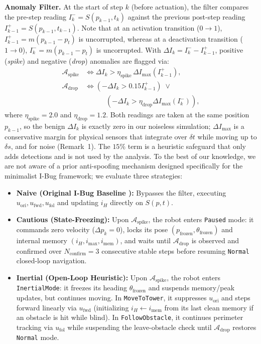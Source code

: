 \documentclass[10pt, a4paper, twocolumn]{article}
\begin{document}
\noindent\textbf{Anomaly Filter.}
At the start of step $k$ (before actuation), the filter compares the pre-step reading $I_k^- = S(p_{k-1}, t_k)$ against the previous post-step reading $I_{k-1}^+ = S(p_{k-1}, t_{k-1})$. Note that at an activation transition ($0 \to 1$), $I_{k-1}^+ = m(p_{k-1}-p_t)$ is uncorrupted, whereas at a deactivation transition ($1 \to 0$), $I_k^- = m(p_{k-1}-p_t)$ is uncorrupted. With $\Delta I_k = I_k^- - I_{k-1}^+$, positive (\textit{spike}) and negative (\textit{drop}) anomalies are flagged via:
\begin{align}
    \mathcal{A}_{\text{spike}} &\iff \Delta I_k > \eta_{\text{spike}}\,\Delta I_{\max}(I_{k-1}^+), \label{eq:spike} \\
    \mathcal{A}_{\text{drop}} &\iff (-\Delta I_k > 0.15 I_{k-1}^+) \;\lor \nonumber\\
    &\qquad\quad (-\Delta I_k > \eta_{\text{drop}}\Delta I_{\max}(I_k^-)), \label{eq:drop}
\end{align}
where $\eta_{\text{spike}} = 2.0$ and $\eta_{\text{drop}} = 1.2$. Both readings are taken at the same position $p_{k-1}$, so the benign $\Delta I_k$ is exactly zero in our noiseless simulation; $\Delta I_{\max}$ is a conservative margin for physical sensors that integrate over $\delta t$ while moving up to $\delta s$, and for noise (Remark~1). The $15\%$ term is a heuristic safeguard that only adds detections and is not used by the analysis. To the best of our knowledge, we are not aware of a prior anti-spoofing mechanism designed specifically for the minimalist I-Bug framework; we evaluate three strategies:
\begin{itemize}
    \item \textbf{Naive (Original I-Bug Baseline \cite{taylor2014intensity}):} Bypasses the filter, executing $u_{\text{ori}}, u_{\text{fwd}}, u_{\text{fol}}$ and updating $i_H$ directly on $S(p, t)$.
    \item \textbf{Cautious (State-Freezing):} Upon $\mathcal{A}_{\text{spike}}$, the robot enters \texttt{Paused} mode: it commands zero velocity ($\Delta p_k = 0$), locks its pose $(p_{\text{frozen}}, \theta_{\text{frozen}})$ and internal memory $(i_H, i_{\text{max}}, i_{\text{mem}})$, and waits until $\mathcal{A}_{\text{drop}}$ is observed and confirmed over $N_{\text{confirm}} = 3$ consecutive stable steps before resuming \texttt{Normal} closed-loop navigation.
    \item \textbf{Inertial (Open-Loop Heuristic):} Upon $\mathcal{A}_{\text{spike}}$, the robot enters \texttt{InertialMode}: it freezes its heading $\theta_{\text{frozen}}$ and suspends memory/peak updates, but continues moving. In \texttt{MoveToTower}, it suppresses $u_{\text{ori}}$ and steps forward linearly via $u_{\text{fwd}}$ (initializing $i_H \leftarrow i_{\text{mem}}$ from its last clean memory if an obstacle is hit while blind). In \texttt{FollowObstacle}, it continues perimeter tracking via $u_{\text{fol}}$ while suspending the leave-obstacle check until $\mathcal{A}_{\text{drop}}$ restores \texttt{Normal} mode.
\end{itemize}
\end{document}

